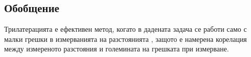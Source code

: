 \subsection{Обобщение}

Трилатерацията е ефективен метод, когато в дадената задача се работи само с малки грешки в измерванията на разстоянията \cite{trilat}, защото е намерена корелация между измереното разстояния и големината на грешката при измерване.